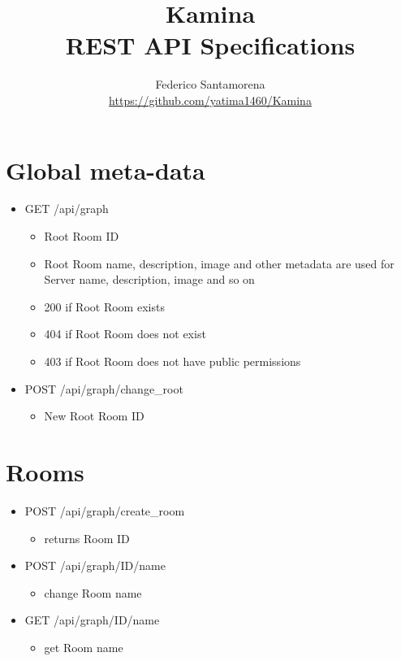 \documentclass[12pt]{article}
\begin{document}
\title
{
    Kamina \\
    REST API Specifications \\
}
\author
{
    Federico Santamorena \\
    \href{https://github.com/yatima1460/Kamina}{https://github.com/yatima1460/Kamina} \\ 
}
\maketitle



\section{Global meta-data}

\begin{itemize}
    \item GET /api/graph
    \begin{itemize}
        \item Root Room ID
        \item Root Room name, description, image and other metadata are used for Server name, description, image and so on
        \item 200 if Root Room exists
        \item 404 if Root Room does not exist
        \item 403 if Root Room does not have public permissions
      
    \end{itemize}
    \item POST /api/graph/change\_root
    \begin{itemize}
        \item New Root Room ID

    \end{itemize}

\end{itemize}



\section{Rooms}


\begin{itemize}
    \item POST /api/graph/create\_room
    \begin{itemize}
        \item returns Room ID
    \end{itemize}
    \item POST /api/graph/ID/name
    \begin{itemize}
        \item change Room name
    \end{itemize}
    \item GET /api/graph/ID/name
    \begin{itemize}
        \item get Room name
    \end{itemize}
\end{itemize}
\end{document}
